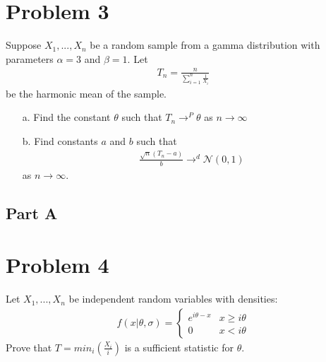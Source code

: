 \documentclass{article}
\begin{document}
\section*{Problem 3}
 Suppose $X_1,..., X_n$ be a random sample from a gamma distribution with parameters $\alpha = 3$ and $\beta = 1$. Let
 \begin{align*}
 T_n = \frac{n}{\sum_{i=1}^{n}\tfrac{1}{X_i}}
 \end{align*}
 be the harmonic mean of the sample.
 \begin{enumerate}
 \item[a.] Find the constant $\theta$ such that $T_n \rightarrow^P \theta$ as $n\rightarrow \infty$
 \item[b.] Find constants $a$ and $b$ such that
 \begin{align*}
 \frac{\sqrt{n}(T_n-a)}{b} \rightarrow^d \mathcal{N}(0,1)
 \end{align*}
 as $n\rightarrow \infty$.
 \end{enumerate}
\subsection*{Part A}





\clearpage

\section*{Problem 4}
Let $X_1,...,X_n$ be independent random variables with densities:
\begin{align*}
f(x|\theta,\sigma) = \begin{cases} 
      e^{i\theta - x} & x \geq i\theta \\
       0 & x < i\theta 
   \end{cases}
\end{align*}
Prove that $T = min_i(\frac{X_i}{i})$ is a sufficient statistic for $\theta$.
\end{document}
